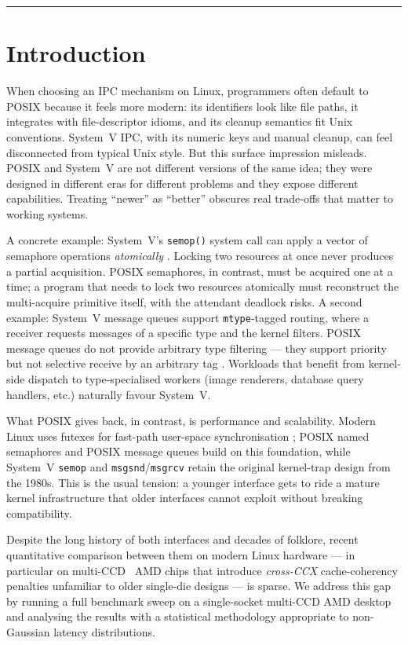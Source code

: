 \documentclass[a4paper,11pt]{article}
\begin{document}
\bigskip\hrule\bigskip

\section{Introduction}
\label{sec:intro}

When choosing an IPC mechanism on Linux, programmers often default to POSIX
because it feels more modern: its identifiers look like file paths, it
integrates with file-descriptor idioms, and its cleanup semantics fit Unix
conventions. System~V IPC, with its numeric keys and manual cleanup, can
feel disconnected from typical Unix style. But this surface impression
misleads. POSIX and System~V are not different versions of the same idea;
they were designed in different eras for different problems and they expose
different capabilities. Treating ``newer'' as ``better'' obscures real
trade-offs that matter to working systems.

A concrete example: System~V's \texttt{semop()} system call can apply a
vector of semaphore operations \emph{atomically} \cite{stevens1999,
linux_sysvipc}. Locking two resources at once never produces a partial
acquisition. POSIX semaphores, in contrast, must be acquired one at a time;
a program that needs to lock two resources atomically must reconstruct the
multi-acquire primitive itself, with the attendant deadlock risks. A second
example: System~V message queues support \texttt{mtype}-tagged routing,
where a receiver requests messages of a specific type and the kernel
filters. POSIX message queues do not provide arbitrary type filtering ---
they support priority but not selective receive by an arbitrary tag
\cite{linux_mq_overview}. Workloads that benefit from kernel-side dispatch
to type-specialised workers (image renderers, database query handlers, etc.)
naturally favour System~V.

What POSIX gives back, in contrast, is performance and scalability. Modern
Linux uses futexes for fast-path user-space synchronisation
\cite{linux_futex, drepper2011futexes}; POSIX named semaphores and POSIX
message queues build on this foundation, while System~V \texttt{semop} and
\texttt{msgsnd}/\texttt{msgrcv} retain the original kernel-trap design from
the 1980s. This is the usual tension: a younger interface gets to ride a
mature kernel infrastructure that older interfaces cannot exploit without
breaking compatibility.

Despite the long history of both interfaces and decades of folklore, recent
quantitative comparison between them on modern Linux hardware --- in
particular on multi-CCD~\cite{amd_zen_arch, amd_infinity_fabric} AMD chips
that introduce \emph{cross-CCX} cache-coherency penalties unfamiliar to
older single-die designs --- is sparse. We address this gap by running a
full benchmark sweep on a single-socket multi-CCD AMD desktop and analysing
the results with a statistical methodology appropriate to non-Gaussian
latency distributions.
\end{document}
